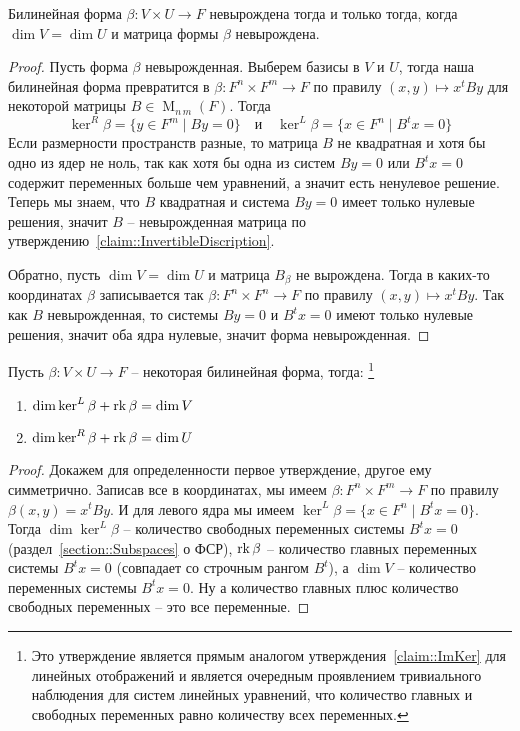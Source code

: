 \begin{claim}
Билинейная форма $\beta\colon V\times U\to F$ невырождена тогда и только тогда, когда $\dim V = \dim U$ и матрица формы $\beta$ невырождена.
\end{claim}
\begin{proof}
Пусть форма $\beta$ невырожденная.
Выберем базисы в $V$ и $U$, тогда наша билинейная форма превратится в $\beta\colon F^n \times F^m\to F$ по правилу $(x,y)\mapsto x^t B y$ для некоторой матрицы $B\in \operatorname{M}_{n\,m}(F)$.
Тогда
\[
\ker^R \beta = \{y\in F^m\mid By = 0\}\quad\text{и}\quad \ker^L\beta = \{x\in F^n \mid B^t x = 0\}
\]
Если размерности пространств разные, то матрица $B$ не квадратная и хотя бы одно из ядер не ноль, так как хотя бы одна из систем $B y = 0$ или $B^t x = 0$ содержит переменных больше чем уравнений, а значит есть ненулевое решение.
Теперь мы знаем, что $B$ квадратная и система $By = 0$ имеет только нулевые решения, значит $B$ -- невырожденная матрица по утверждению~\ref{claim::InvertibleDiscription}.

Обратно, пусть $\dim V = \dim U$ и матрица $B_\beta$ не вырождена.
Тогда в каких-то координатах $\beta$ записывается так $\beta\colon F^n \times F^n \to F$ по правилу $(x,y)\mapsto x^t By$.
Так как $B$ невырожденная, то системы $B y = 0$ и $B^t x = 0$ имеют только нулевые решения, значит оба ядра нулевые, значит форма невырожденная.
\end{proof}

\begin{claim}
\label{claim::BilinearKernels}
Пусть $\beta\colon V\times U\to F$ -- некоторая билинейная форма, тогда:%
\footnote{Это утверждение является прямым аналогом утверждения~\ref{claim::ImKer} для линейных отображений и является очередным проявлением тривиального наблюдения для систем линейных уравнений, что количество главных и свободных переменных равно количеству всех переменных.}
\begin{enumerate}
\item $\dim\ker^L \beta + \operatorname{rk} \beta = \dim V$

\item $\dim\ker^R \beta + \operatorname{rk} \beta = \dim U$
\end{enumerate}
\end{claim}
\begin{proof}
Докажем для определенности первое утверждение, другое ему симметрично.
Записав все в координатах, мы имеем $\beta \colon F^n \times F^m \to F$ по правилу $\beta(x,y) = x^t By$.
И для левого ядра мы имеем $\ker^L \beta = \{x\in F^n \mid B^t x = 0\}$.
Тогда $\dim \ker^L\beta$ -- количество свободных переменных системы $B^t x=0$ (раздел~\ref{section::Subspaces} о ФСР), $\operatorname{rk} \beta$ -- количество главных переменных системы $B^t x = 0$ (совпадает со строчным рангом $B^t$), а $\dim V $ -- количество переменных системы $B^t x = 0$.
Ну а количество главных плюс количество свободных переменных -- это все переменные.
\end{proof}

